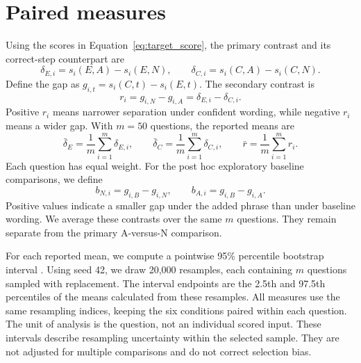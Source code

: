 \section{Paired measures}
Using the scores in Equation~\ref{eq:target_score}, the primary contrast and its correct-step counterpart are
\begin{equation}
\delta_{E,i}=s_i(E,A)-s_i(E,N),\qquad
\delta_{C,i}=s_i(C,A)-s_i(C,N).
\label{eq:wording_effects}
\end{equation}
Define the gap as $g_{i,t}=s_i(C,t)-s_i(E,t)$. The secondary contrast is
\begin{equation}
r_i=g_{i,N}-g_{i,A}=\delta_{E,i}-\delta_{C,i}.
\label{eq:gap_reduction}
\end{equation}
Positive $r_i$ means narrower separation under confident wording, while negative $r_i$ means a wider gap. With $m=50$ questions, the reported means are
\begin{equation}
\bar\delta_E=\frac{1}{m}\sum_{i=1}^{m}\delta_{E,i},\qquad
\bar\delta_C=\frac{1}{m}\sum_{i=1}^{m}\delta_{C,i},\qquad
\bar r=\frac{1}{m}\sum_{i=1}^{m}r_i.
\label{eq:mean_effects}
\end{equation}
Each question has equal weight. For the post hoc exploratory baseline comparisons, we define
\begin{equation}
b_{N,i}=g_{i,B}-g_{i,N},\qquad
b_{A,i}=g_{i,B}-g_{i,A}.
\label{eq:baseline_contrasts}
\end{equation}
Positive values indicate a smaller gap under the added phrase than under baseline wording. We average these contrasts over the same $m$ questions. They remain separate from the primary A-versus-N comparison.

For each reported mean, we compute a pointwise 95\% percentile bootstrap interval \citep{efron1979}. Using seed 42, we draw 20,000 resamples, each containing $m$ questions sampled with replacement. The interval endpoints are the 2.5th and 97.5th percentiles of the means calculated from these resamples. All measures use the same resampling indices, keeping the six conditions paired within each question. The unit of analysis is the question, not an individual scored input. These intervals describe resampling uncertainty within the selected sample. They are not adjusted for multiple comparisons and do not correct selection bias.
